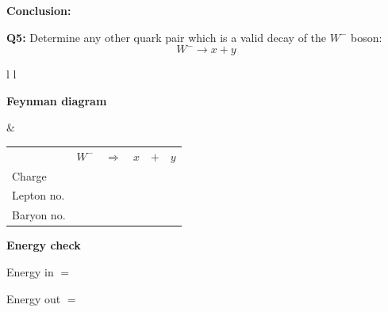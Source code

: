\documentclass[12pt]{article}
\begin{document}
\vspace{0.5cm}

\textbf{Conclusion:}

\vspace{2.5cm}


\textbf{Q5:} Determine any other quark pair which is a valid decay of the $W^-$ boson:
\[
W^- \rightarrow x + y
\]

\vspace{0.5cm}

\begin{tabular}{l l}

\begin{minipage}[t]{0.46\textwidth}
\vspace{0pt}
\textbf{Feynman diagram}

\vspace{0.6cm}

\begin{tikzpicture}
\begin{feynman}
  \vertex (W) at (0,2) {};
  \vertex [coordinate] (v) at (3,2) {};

  \vertex (x) at (4,4) {\(x\)};
  \vertex (y) at (5,3) {\(y\)};

  \diagram*{
    (W) -- [boson, edge label=\(W^-\), momentum'={}] (v),
    (v) -- [fermion] (x),
    (v) -- [fermion] (y),
  };
\end{feynman}
\end{tikzpicture}
\end{minipage}
&
\begin{minipage}[t]{0.50\textwidth}
\vspace{0pt}

\renewcommand{\arraystretch}{1.4}
\begin{tabular}{@{}l c c c c c@{}}
 & \(W^-\) & \(\Rightarrow\) & \(x\) & \(+\) & \(y\) \\
Charge &  &  &  &  &  \\
Lepton no. &  &  &  &  &  \\
Baryon no. &  &  &  &  &  \\
\end{tabular}

\vspace{0.6cm}

\textbf{Energy check}

Energy in $=$

Energy out $=$

\end{minipage}

\end{tabular}
\end{document}

